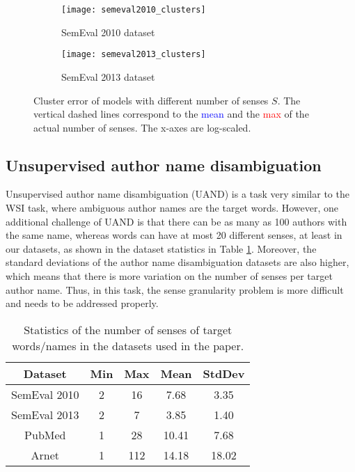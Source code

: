 \documentclass[letterpaper]{article} \usepackage{aaai19}
\begin{document}
\begin{figure}[!t]
	\centering
	\begin{subfigure}{0.45\textwidth}
	    \centering
		\texttt{[image: semeval2010\_clusters]}
		\caption{SemEval 2010 dataset}
	\end{subfigure}
	\begin{subfigure}{0.45\textwidth}
	    \centering
		\texttt{[image: semeval2013\_clusters]}
		\caption{SemEval 2013 dataset}
	\end{subfigure}
	\caption{Cluster error of models with different number of senses $S$. The vertical dashed lines correspond to the \textcolor{blue}{mean} and the \textcolor{red}{max} of the actual number of senses. The x-axes are log-scaled.}
	\label{fig:clusters}
\end{figure}

\subsection{Unsupervised author name disambiguation}

Unsupervised author name disambiguation (UAND) is a task very similar to the WSI task, where ambiguous author names are the target words. However, one additional challenge of UAND is that there can be as many as 100 authors with the same name, whereas words can have at most 20 different senses, at least in our datasets, as shown in the dataset statistics in Table \ref{tab:stat}. Moreover, the standard deviations of the author name disambiguation datasets are also higher, which means that there is more variation on the number of senses per target author name. Thus, in this task, the sense granularity problem is more difficult and needs to be addressed properly.

\begin{table}[t]
    \centering
    \begin{tabular}{|c|cccc|}
        \hline
        Dataset & Min & Max & Mean & StdDev \\
        \hline
        SemEval 2010 & 2 & 16 & 7.68 & 3.35 \\ \hline
        SemEval 2013 & 2 & 7 & 3.85 & 1.40 \\ \hline
        PubMed & 1 & 28 & 10.41 & 7.68 \\ \hline
        Arnet & 1 & 112 & 14.18 & 18.02 \\
        \hline
    \end{tabular}
    \caption{Statistics of the number of senses of target words/names in the datasets used in the paper.}
    \label{tab:stat}
\end{table}
\end{document}
